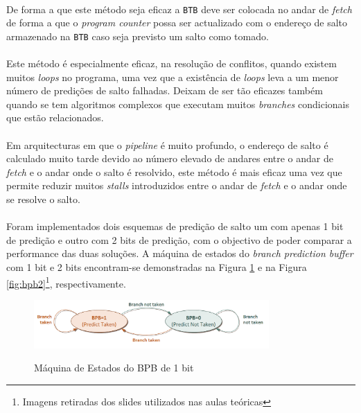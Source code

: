 \paragraph{} De forma a que este método seja eficaz a \texttt{BTB} deve ser colocada no andar de \textit{fetch} de forma a que o \textit{program counter} possa ser actualizado com o endereço de salto armazenado na \texttt{BTB} caso seja previsto um salto como tomado.

\paragraph{} Este método é especialmente eficaz, na resolução de conflitos, quando existem muitos \textit{loops} no programa, uma vez que a existência de \textit{loops} leva a um menor número de predições de salto falhadas. Deixam de ser tão eficazes também quando se tem algoritmos complexos que executam muitos \textit{branches} condicionais que estão relacionados.

\paragraph{} Em arquitecturas em que o \textit{pipeline} é muito profundo, o endereço de salto é calculado muito tarde devido ao número elevado de andares entre o andar de \textit{fetch} e o andar onde o salto é resolvido, este método é mais eficaz uma vez que permite reduzir muitos \textit{stalls} introduzidos entre o andar de \textit{fetch} e o andar onde se resolve o salto.

\paragraph{} Foram implementados dois esquemas de predição de salto um com apenas 1 bit de predição e outro com 2 bits de predição, com o objectivo de poder comparar a performance das duas soluções. A máquina de estados do \textit{branch prediction buffer} com 1 bit e 2 bits encontram-se demonstradas na Figura \ref{fig:bpb1} e na Figura \ref{fig:bpb2}\footnote{Imagens retiradas dos slides utilizados nas aulas teóricas}, respectivamente.

\begin{figure}[H]
    \centering
    \includegraphics[width=0.8\textwidth]{./btb1bit.png}~\\[1cm]
    \caption{Máquina de Estados do BPB de 1 bit}
    \label{fig:bpb1}
\end{figure}

